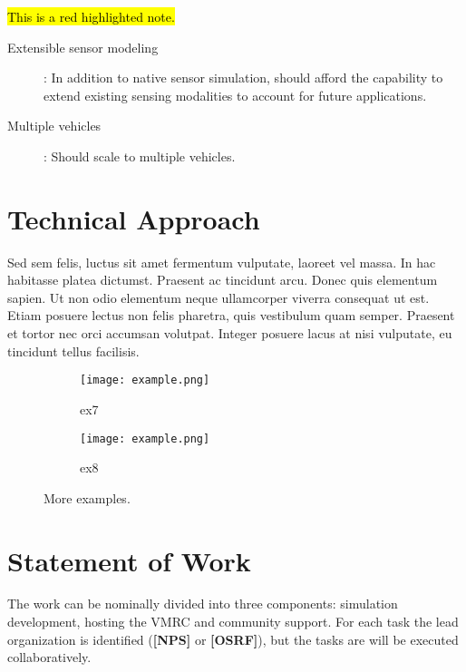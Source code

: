 \documentclass[11pt]{article}
\DeclareRobustCommand{\hlr}[1]{{\sethlcolor{red}\hl{#1}}}
\begin{document}
\hlr{This is a red highlighted note.}

\begin{description}
\item[Extensible sensor modeling]: In addition to native sensor simulation, should afford the capability to extend existing sensing modalities to account for future applications.
\item[Multiple vehicles]: Should scale to multiple vehicles.
\end{description}

\section{Technical Approach}
Sed sem felis, luctus sit amet fermentum vulputate, laoreet vel massa. In hac habitasse platea dictumst. Praesent ac tincidunt arcu. Donec quis elementum sapien. Ut non odio elementum neque ullamcorper viverra consequat ut est. Etiam posuere lectus non felis pharetra, quis vestibulum quam semper. Praesent et tortor nec orci accumsan volutpat. Integer posuere lacus at nisi vulputate, eu tincidunt tellus facilisis.

\begin{figure}[htbp]
\begin{subfigure}[t]{0.65\textwidth}
  \centering
  \texttt{[image: example.png]}
  \captionsetup{width=0.9\linewidth}
  \caption{ex7}
  \label{f:ex7}
\end{subfigure}
\begin{subfigure}[t]{0.35\textwidth}
  \centering
  \texttt{[image: example.png]}
  \captionsetup{width=0.9\linewidth}
  \caption{ex8}
  \label{f:ex8}
\end{subfigure}
\caption{More examples.}
\label{f:more_ex}
\end{figure}

\section{Statement of Work}
The work can be nominally divided into three components: simulation development, hosting the VMRC and community support.  For each task the lead organization is identified ({\bf[NPS]} or {\bf[OSRF]}), but the tasks are will be executed collaboratively.

\end{document}
